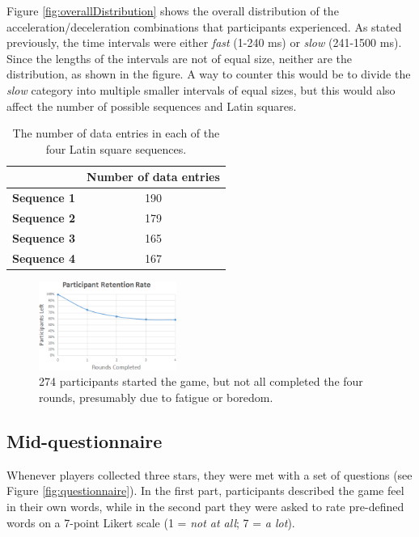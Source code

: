 Figure \ref{fig:overallDistribution} shows the overall distribution of the acceleration/deceleration combinations that participants experienced. As stated previously, the time intervals were either \textit{fast} (1-240 ms) or \textit{slow} (241-1500 ms). Since the lengths of the intervals are not of equal size, neither are the distribution, as shown in the figure. A way to counter this would be to divide the \textit{slow} category into multiple smaller intervals of equal sizes, but this would also affect the number of possible sequences and Latin squares.

\begin{table} \centering
\caption{The number of data entries in each of the four Latin square sequences.}
\label{table:latinSequenceNumber}
\begin{tabular}{cc}
\toprule
& \textbf{Number of data entries}\\
\midrule
\textbf{Sequence 1} & 190\\
\textbf{Sequence 2} & 179\\
\textbf{Sequence 3} & 165\\
\textbf{Sequence 4} & 167\\
\bottomrule
\end{tabular}
\end{table}

\begin{figure}[htbp]
\centering
\includegraphics[width=0.4\textwidth]{Pics/retetionRate}
\caption{274 participants started the game, but not all completed the four rounds, presumably due to fatigue or boredom.}
\label{fig:retention}
\end{figure}

\subsection{Mid-questionnaire}
Whenever players collected three stars, they were met with a set of questions (see Figure \ref{fig:questionnaire}). In the first part, participants described the game feel in their own words, while in the second part they were asked to rate pre-defined words on a 7-point Likert scale (1 = \textit{not at all}; 7 = \textit{a lot}).

